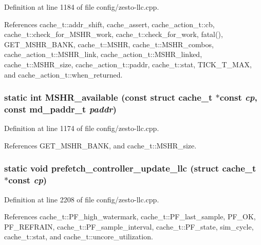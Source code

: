 Definition at line 1184 of file config/zesto-llc.cpp.

References cache\_\-t::addr\_\-shift, cache\_\-assert, cache\_\-action\_\-t::cb, cache\_\-t::check\_\-for\_\-MSHR\_\-work, cache\_\-t::check\_\-for\_\-work, fatal(), GET\_\-MSHR\_\-BANK, cache\_\-t::MSHR, cache\_\-t::MSHR\_\-combos, cache\_\-action\_\-t::MSHR\_\-link, cache\_\-action\_\-t::MSHR\_\-linked, cache\_\-t::MSHR\_\-size, cache\_\-action\_\-t::paddr, cache\_\-t::stat, TICK\_\-T\_\-MAX, and cache\_\-action\_\-t::when\_\-returned.
\subsubsection[{MSHR\_\-available}]{\setlength{\rightskip}{0pt plus 5cm}static int MSHR\_\-available (const struct {\bf cache\_\-t} $\ast$const  {\em cp}, \/  const {\bf md\_\-paddr\_\-t} {\em paddr})\hspace{0.3cm}{\tt  [inline, static]}}\label{config_2zesto-llc_8cpp_eb1b85c3ab5d1ac1520577d21fd09dee}




Definition at line 1174 of file config/zesto-llc.cpp.

References GET\_\-MSHR\_\-BANK, and cache\_\-t::MSHR\_\-size.
\subsubsection[{prefetch\_\-controller\_\-update\_\-llc}]{\setlength{\rightskip}{0pt plus 5cm}static void prefetch\_\-controller\_\-update\_\-llc (struct {\bf cache\_\-t} $\ast$const  {\em cp})\hspace{0.3cm}{\tt  [static]}}\label{config_2zesto-llc_8cpp_2a67725e0ce33f38cea945ca6beef7d7}




Definition at line 2208 of file config/zesto-llc.cpp.

References cache\_\-t::PF\_\-high\_\-watermark, cache\_\-t::PF\_\-last\_\-sample, PF\_\-OK, PF\_\-REFRAIN, cache\_\-t::PF\_\-sample\_\-interval, cache\_\-t::PF\_\-state, sim\_\-cycle, cache\_\-t::stat, and cache\_\-t::uncore\_\-utilization.

